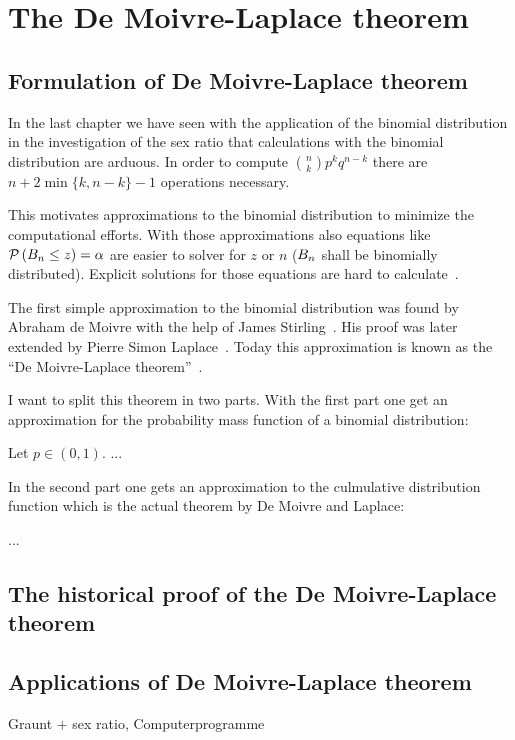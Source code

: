 \chapter{The De Moivre-Laplace theorem}

\section{Formulation of De Moivre-Laplace theorem}

In the last chapter we have seen with the application of the binomial distribution in the investigation of the sex ratio that calculations with the binomial distribution are arduous. In order to compute $\binom nk p^kq^{n-k}$ there are $n+2\min\{k,n-k\}-1$ operations necessary.

This motivates approximations to the binomial distribution to minimize the computational efforts. With those approximations also equations like $\mathcal P\left({B_{n} \le z}\right)=\alpha$ are easier to solver for $z$ or $n$ ($B_{n}$ shall be binomially distributed). Explicit solutions for those equations are hard to calculate~\cite[p. 469]{hald1}.

The first simple approximation to the binomial distribution was found by Abraham de Moivre with the help of James Stirling~\cite[p. 469]{hald1}. His proof was later extended by Pierre Simon Laplace~\cite[pp. 495 ff.]{hald1}. Today this approximation is known as the ``De Moivre-Laplace theorem''~\cite[pp. 64-67]{irle}. 

I want to split this theorem in two parts. With the first part one get an approximation for the probability mass function of a binomial distribution:

\begin{theorem}
  Let $p\in(0,1)$. ...
\end{theorem}

In the second part one gets an approximation to the culmulative distribution function which is the actual theorem by De Moivre and Laplace:

\begin{theorem}
  ...
\end{theorem}

\section{The historical proof of the De Moivre-Laplace theorem}

\section{Applications of De Moivre-Laplace theorem}

Graunt + sex ratio, Computerprogramme
